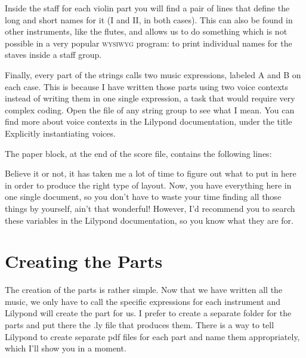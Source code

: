 \documentclass[../../LilyPond-Tutorials]{subfiles}
\begin{document}
Inside the staff for each violin part you will find a pair of lines that define the long and short names for it (I and II, in both cases).
This can also be found in other instruments, like the flutes, and allows us to do something which is not possible in a very popular \textsc{wysiwyg} program: to print individual names for the staves inside a staff group.

Finally, every part of the strings calls two music expressions, labeled A and B on each case.
This is because I have written those parts using two voice contexts instead of writing them in one single expression, a task that would require very complex coding.
Open the file of any string group to see what I mean.
You can find more about voice contexts in the Lilypond documentation, under the title Explicitly instantiating voices.

The paper block, at the end of the score file, contains the following lines:

\begin{lilypondcode}
\end{lilypondcode}

Believe it or not, it has taken me a lot of time to figure out what to put in here in order to produce the right type of layout.
Now, you have everything here in one single document, so you don't have to waste your time finding all those things by yourself, ain't that wonderful!
However, I'd recommend you to search these variables in the Lilypond documentation, so you know what they are for.

\section{Creating the Parts}

The creation of the parts is rather simple.
Now that we have written all the music, we only have to call the specific expressions for each instrument and Lilypond will create the part for us.
I prefer to create a separate folder for the parts and put there the .ly file that produces them.
There is a way to tell Lilypond to create separate pdf files for each part and name them appropriately, which I'll show you in a moment.
\end{document}
